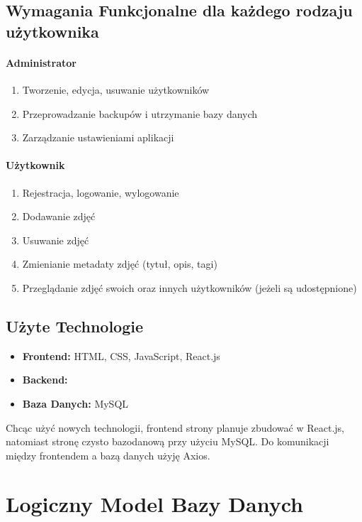 \documentclass[12pt,a4paper]{article}
\begin{document}
\subsection{Wymagania Funkcjonalne dla każdego rodzaju użytkownika}
\paragraph{Administrator}
\begin{enumerate}
    \item Tworzenie, edycja, usuwanie użytkowników
    \item Przeprowadzanie backupów i utrzymanie bazy danych
    \item Zarządzanie ustawieniami aplikacji
\end{enumerate}

\paragraph{Użytkownik}
\begin{enumerate}
    \item Rejestracja, logowanie, wylogowanie
    \item Dodawanie zdjęć
    \item Usuwanie zdjęć
    \item Zmienianie metadaty zdjęć (tytuł, opis, tagi)
    \item Przeglądanie zdjęć swoich oraz innych użytkowników (jeżeli są udostępnione)
\end{enumerate}

\subsection{Użyte Technologie}
\begin{itemize}
    \item \textbf{Frontend:} HTML, CSS, JavaScript, React.js
    \item \textbf{Backend:}
    \item \textbf{Baza Danych:} MySQL
\end{itemize}
Chcąc użyć nowych technologii, frontend strony planuje zbudować w React.js, natomiast stronę czysto bazodanową przy użyciu MySQL. Do komunikacji między frontendem a bazą danych użyję Axios.

\section{Logiczny Model Bazy Danych}
\end{document}
